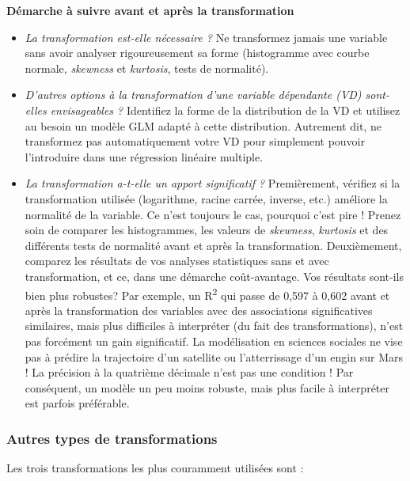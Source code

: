 \documentclass[
  11pt,
  french,
]{book}
\makeatletter
\newenvironment{kframev}{%
\medskip{}
\setlength{\fboxsep}{.8em}
 \def\at@end@of@kframev{}%
 \ifinner\ifhmode%
  \def\at@end@of@kframev{\end{minipage}}%
  \begin{minipage}{\columnwidth}%
 \fi\fi%
 \def\FrameCommand##1{\hskip\@totalleftmargin \hskip-\fboxsep
 \colorbox{shadebluecolor}{##1}\hskip-\fboxsep
     \hskip-\linewidth \hskip-\@totalleftmargin \hskip\columnwidth}%
 \MakeFramed {\advance\hsize-\width
   \@totalleftmargin\z@ \linewidth\hsize
   \@setminipage}}%
 {\par\unskip\endMakeFramed%
 \at@end@of@kframev}
\newenvironment{rmdblock}[1]
  {
  \begin{itemize}
  \renewcommand{\labelitemi}{
    \raisebox{-.7\height}[0pt][0pt]{
      {\setkeys{Gin}{width=3em,keepaspectratio}\texttt{[image: images/\#1]}}
    }
  }
  \setlength{\fboxsep}{1em}
  \begin{kframev}
  \small
  \item
  }
  {
  \end{kframev}
  \end{itemize}
  }
\newenvironment{bloc_attention}
  {\begin{rmdblock}{attention}}
  {\end{rmdblock}}
\makeatother
\begin{document}
\begin{bloc_attention}
\textbf{Démarche à suivre avant et après la transformation}

\begin{itemize}
\item
  \emph{La transformation est-elle nécessaire ?} Ne transformez jamais une variable sans avoir analyser rigoureusement sa forme (histogramme avec courbe normale, \emph{skewness} et \emph{kurtosis}, tests de normalité).
\item
  \emph{D'autres options à la transformation d'une variable dépendante (VD) sont-elles envisageables ?} Identifiez la forme de la distribution de la VD et utilisez au besoin un modèle GLM adapté à cette distribution. Autrement dit, ne transformez pas automatiquement votre VD pour simplement pouvoir l'introduire dans une régression linéaire multiple.
\item
  \emph{La transformation a-t-elle un apport significatif ?} Premièrement, vérifiez si la transformation utilisée (logarithme, racine carrée, inverse, etc.) améliore la normalité de la variable. Ce n'est toujours le cas, pourquoi c'est pire ! Prenez soin de comparer les histogrammes, les valeurs de \emph{skewness}, \emph{kurtosis} et des différents tests de normalité avant et après la transformation. Deuxièmement, comparez les résultats de vos analyses statistiques sans et avec transformation, et ce, dans une démarche coût-avantage. Vos résultats sont-ils bien plus robustes? Par exemple, un R\textsuperscript{2} qui passe de 0,597 à 0,602 avant et après la transformation des variables avec des associations significatives similaires, mais plus difficiles à interpréter (du fait des transformations), n'est pas forcément un gain significatif. La modélisation en sciences sociales ne vise pas à prédire la trajectoire d'un satellite ou l'atterrissage d'un engin sur Mars ! La précision à la quatrième décimale n'est pas une condition ! Par conséquent, un modèle un peu moins robuste, mais plus facile à interpréter est parfois préférable.
\end{itemize}

\end{bloc_attention}

\hypertarget{sect02552}{%
\subsubsection{Autres types de transformations}\label{sect02552}}

Les trois transformations les plus couramment utilisées sont :
\end{document}
